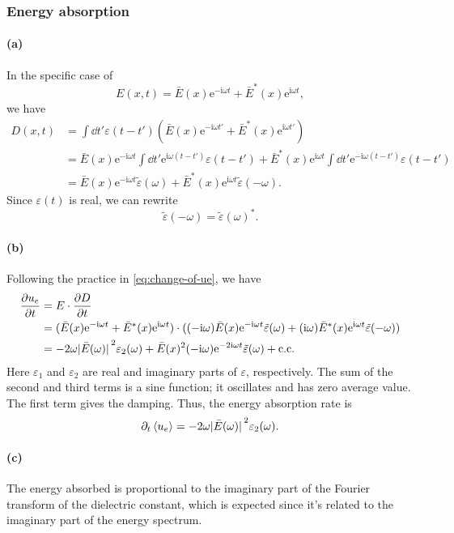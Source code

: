 \documentclass[hyperref, a4paper]{article}
\newcommand*{\ii}{\mathrm{i}}
\newcommand*{\ee}{\mathrm{e}}
\begin{document}
\subsubsection{Energy absorption}

\paragraph{(a)} In the specific case of 
\begin{equation}
    E(x, t) = \bar{E}(x) \ee^{- \ii \omega t} + \bar{E}^*(x) \ee^{\ii \omega t},
\end{equation}
we have 
\begin{equation}
    \begin{aligned}
        D(x, t) &= \int \dd{t'} \varepsilon(t - t') (
            \bar{E}(x) \ee^{- \ii \omega t'} + \bar{E}^*(x) \ee^{\ii \omega t'}
        ) \\
        &= \bar{E}(x) \ee^{- \ii \omega t} \int \dd{t'} 
        \ee^{\ii \omega (t - t')} \varepsilon(t - t') 
        + \bar{E}^*(x) \ee^{\ii \omega t} \int \dd{t'} 
        \ee^{- \ii \omega (t - t')} \varepsilon(t - t' ) \\
        &= \bar{E}(x) \ee^{- \ii \omega t} \tilde{\varepsilon}(\omega)
        + \bar{E}^*(x) \ee^{\ii \omega t} \tilde{\varepsilon}(- \omega).
    \end{aligned}
\end{equation}
Since $\varepsilon(t)$ is real, we can rewrite 
\begin{equation}
    \tilde{\varepsilon}(- \omega) = \tilde{\varepsilon}(\omega)^*.
\end{equation}

\paragraph{(b)} Following the practice in \eqref{eq:change-of-ue}, we have 
\begin{equation}
    \begin{aligned}
        \pdv{u_e}{t} &= E \cdot \pdv{D}{t} \\
        &= (
            \bar{E}(x) \ee^{- \ii \omega t} + \bar{E}^*(x) \ee^{\ii \omega t}
        ) \cdot (
            (- \ii \omega) \bar{E}(x) \ee^{- \ii \omega t} \tilde{\varepsilon}(\omega)
            + (\ii \omega) \bar{E}^*(x) \ee^{\ii \omega t} \tilde{\varepsilon}(- \omega)
        ) \\
        &= - 2 \omega \abs*{\bar{E}(\omega)}^2 \varepsilon_2(\omega)
        + \bar{E}(x)^2 (- \ii \omega) \ee^{- 2 \ii \omega t} \tilde{\varepsilon}(\omega)
        + \text{c.c.}
    \end{aligned}
\end{equation}
Here $\varepsilon_1$ and $\varepsilon_2$ 
are real and imaginary parts of $\varepsilon$, respectively.
The sum of the second and third terms is a sine function; 
it oscillates and has zero average value.
The first term gives the damping.
Thus, the energy absorption rate is 
\begin{equation}
    \partial_t \expval{u_e} = - 2 \omega \abs*{\bar{E}(\omega)}^2 \varepsilon_2(\omega).
\end{equation}

\paragraph{(c)} The energy absorbed is proportional to the imaginary part 
of the Fourier transform of the dielectric constant, 
which is expected since it's related to the imaginary part of the energy spectrum.
\end{document}
